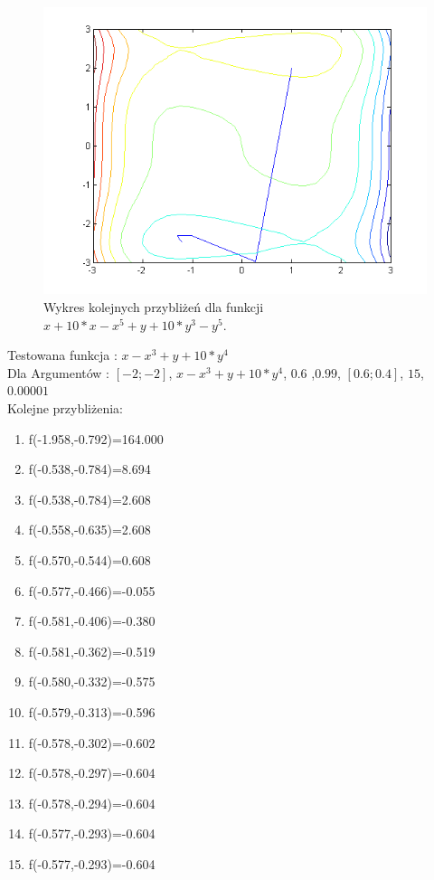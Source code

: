 \documentclass{classrep}
\begin{document}
\begin{figure}[H]
\centering
\includegraphics[width=12cm]{fcja2} 
\caption{Wykres kolejnych przybliżeń dla funkcji  $x + 10*x - x^5 + y + 10*y^3 - y^5$.}
\label{fig:funkcja_2}
\end{figure}

Testowana funkcja : $x - x^{3} +y+10*y^{4}$\\
Dla Argumentów : $[-2;-2]$, $x - x^{3}+y+10*y^{4}$, $0.6$ ,$0.99$, $[0.6;0.4]$, $15$, $0.00001$\\
Kolejne przybliżenia:
\begin{enumerate}
\item f(-1.958,-0.792)=164.000
\item f(-0.538,-0.784)=8.694
\item f(-0.538,-0.784)=2.608
\item f(-0.558,-0.635)=2.608
\item f(-0.570,-0.544)=0.608
\item f(-0.577,-0.466)=-0.055
\item f(-0.581,-0.406)=-0.380
\item f(-0.581,-0.362)=-0.519
\item f(-0.580,-0.332)=-0.575
\item f(-0.579,-0.313)=-0.596
\item f(-0.578,-0.302)=-0.602
\item f(-0.578,-0.297)=-0.604
\item f(-0.578,-0.294)=-0.604
\item f(-0.577,-0.293)=-0.604
\item f(-0.577,-0.293)=-0.604
\end{enumerate}
\end{document}
